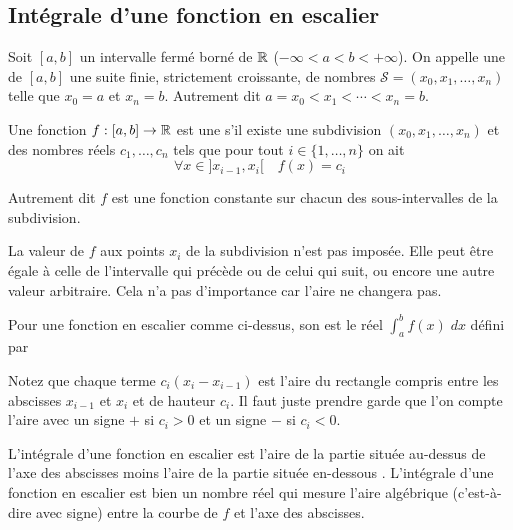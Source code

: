 \documentclass[class=report,crop=false]{standalone}
\begin{document}


\subsection{Intégrale d'une fonction en escalier}
\label{ssec:escalier}
\label{ssec:int11}

\begin{definition}
Soit $[a,b]$ un intervalle fermé borné de $\mathbb{R}$
($-\infty<a<b<+\infty$). On appelle une  de $[a,b]$ une suite finie,
strictement croissante, de nombres $\mathcal{S}=(x_0,x_1,\ldots,x_n)$ telle que $x_0=a$ et
$x_n=b$. Autrement dit $a=x_0< x_1<\cdots< x_n=b$.
\end{definition}


\begin{definition}
Une fonction $f : [a,b] \to \mathbb{R}$ est une 
s'il existe  une subdivision $(x_0,x_1,\ldots,x_n)$ et des nombres réels
$c_1,\ldots,c_n$ tels que pour tout $i\in \{1,\ldots,n\}$ on ait
$$\forall x \in ]x_{i-1},x_i[ \quad f(x)=c_i$$
\end{definition}

Autrement dit $f$ est une fonction constante sur chacun des sous-intervalles de la subdivision.


\begin{remarque*}
La valeur de $f$ aux points $x_i$ de la subdivision n'est pas imposée. Elle peut être égale à
celle de l'intervalle qui précède ou de celui qui suit, ou encore une autre valeur arbitraire.
Cela n'a pas d'importance car l'aire ne changera pas.
\end{remarque*}

\begin{definition}
Pour une fonction en escalier comme ci-dessus, son 
est le réel $\int_a^b f(x) \; dx$ défini par
\end{definition}



\begin{remarque*}
Notez que chaque terme $c_i(x_i-x_{i-1})$ est l'aire du rectangle compris entre les abscisses
$x_{i-1}$ et $x_i$ et de hauteur $c_i$. Il faut juste prendre garde que l'on compte l'aire
avec un signe \og $+$ \fg{} si $c_i>0$ et un signe \og $-$ \fg{} si $c_i<0$.


L'intégrale d'une fonction en escalier est l'aire de la partie %
située au-dessus
de l'axe des abscisses  moins l'aire de la partie %
située en-dessous  .
L'intégrale d'une fonction en escalier est bien un nombre réel qui mesure l'aire algébrique
(c'est-à-dire avec signe) entre la courbe de $f$ et l'axe des abscisses.
\end{remarque*}
\end{document}
